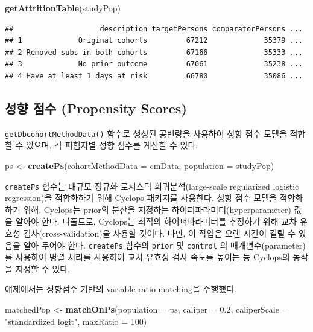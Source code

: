 \documentclass[11pt]{book}
\newenvironment{Shaded}{\begin{snugshade}}{\end{snugshade}}
\newcommand{\KeywordTok}[1]{\textcolor[rgb]{0.13,0.29,0.53}{\textbf{#1}}}
\newcommand{\DataTypeTok}[1]{\textcolor[rgb]{0.13,0.29,0.53}{#1}}
\newcommand{\DecValTok}[1]{\textcolor[rgb]{0.00,0.00,0.81}{#1}}
\newcommand{\FloatTok}[1]{\textcolor[rgb]{0.00,0.00,0.81}{#1}}
\newcommand{\StringTok}[1]{\textcolor[rgb]{0.31,0.60,0.02}{#1}}
\newcommand{\NormalTok}[1]{#1}
\theoremstyle{definition}
\theoremstyle{definition}
\theoremstyle{definition}
\theoremstyle{remark}
\begin{document}
\begin{Shaded}
\begin{Highlighting}[]
\KeywordTok{getAttritionTable}\NormalTok{(studyPop)}
\end{Highlighting}
\end{Shaded}

\begin{verbatim}
##                    description targetPersons comparatorPersons ...
## 1             Original cohorts         67212             35379 ...
## 2 Removed subs in both cohorts         67166             35333 ...
## 3             No prior outcome         67061             35238 ...
## 4 Have at least 1 days at risk         66780             35086 ...
\end{verbatim}

\subsection{성향 점수 (Propensity Scores)}\label{--propensity-scores}

\texttt{getDbcohortMethodData()} 함수로 생성된 공변량을 사용하여 성향
점수 모델을 적합할 수 있으며, 각 피험자별 성향 점수를 계산할 수 있다.

\begin{Shaded}
\begin{Highlighting}[]
\NormalTok{ps <-}\StringTok{ }\KeywordTok{createPs}\NormalTok{(}\DataTypeTok{cohortMethodData =}\NormalTok{ cmData, }\DataTypeTok{population =}\NormalTok{ studyPop)}
\end{Highlighting}
\end{Shaded}

\texttt{createPs} 함수는 대규모 정규화 로지스틱 회귀분석(large-scale
regularized logistic regression)을 적합화하기 위해
\href{https://ohdsi.github.io/Cyclops/}{Cyclops} 패키지를 사용한다. 성향
점수 모델을 적합화하기 위해, Cyclops는 prior의 분산을 지정하는
하이퍼파라미터(hyperparameter) 값을 알아야 한다. 디폴트로, Cyclops는
최적의 하이퍼파라미터를 추정하기 위해 교차 유효성
검사(cross-validation)을 사용할 것이다. 다만, 이 작업은 오랜 시간이 걸릴
수 있음을 알아 두어야 한다. \texttt{createPs} 함수의 \texttt{prior} 및
\texttt{control} 의 매개변수(parameter)를 사용하여 병렬 처리를 사용하여
교차 유효성 검사 속도를 높이는 등 Cyclops의 동작을 지정할 수 있다.

얘제에서는 성향점수 기반의 variable-ratio matching을 수행했다.

\begin{Shaded}
\begin{Highlighting}[]
\NormalTok{matchedPop <-}\StringTok{ }\KeywordTok{matchOnPs}\NormalTok{(}\DataTypeTok{population =}\NormalTok{ ps, }\DataTypeTok{caliper =} \FloatTok{0.2}\NormalTok{,}
                        \DataTypeTok{caliperScale =} \StringTok{"standardized logit"}\NormalTok{, }\DataTypeTok{maxRatio =} \DecValTok{100}\NormalTok{)}
\end{Highlighting}
\end{Shaded}
\end{document}
